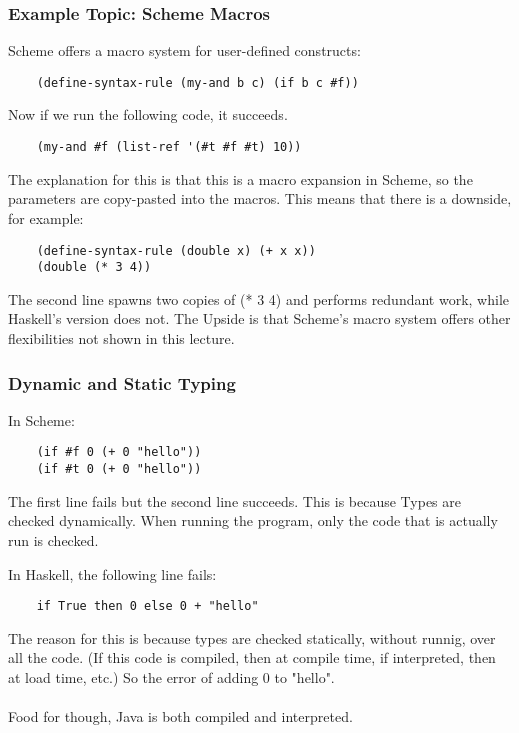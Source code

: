 \documentclass[12pt]{article}
\begin{document}
\subsubsection{Example Topic: Scheme Macros}

Scheme offers a macro system for user-defined constructs:

\begin{lstlisting}
    (define-syntax-rule (my-and b c) (if b c #f))
\end{lstlisting}

Now if we run the following code, it succeeds.

\begin{lstlisting}
    (my-and #f (list-ref '(#t #f #t) 10))
\end{lstlisting}

The explanation for this is that this is a macro expansion in Scheme, so the parameters are copy-pasted into the macros. This means that there is a downside, for example:

\begin{lstlisting}
    (define-syntax-rule (double x) (+ x x))
    (double (* 3 4))
\end{lstlisting}

The second line spawns two copies of (* 3 4) and performs redundant work, while Haskell's version does not. The Upside is that Scheme's macro system offers other flexibilities not shown in this lecture.

\subsubsection{Dynamic and Static Typing}

In Scheme:
\begin{lstlisting}
    (if #f 0 (+ 0 "hello"))
    (if #t 0 (+ 0 "hello"))
\end{lstlisting}

The first line fails but the second line succeeds. This is because Types are checked dynamically. When running the program, only the code that is actually run is checked.

In Haskell, the following line fails:
\begin{lstlisting}
    if True then 0 else 0 + "hello"
\end{lstlisting}

The reason for this is because types are checked statically, without runnig, over all the code. (If this code is compiled, then at compile time, if interpreted, then at load time, etc.) So the error of adding 0 to "hello".\\
\\
Food for though, Java is both compiled and interpreted.
\end{document}
